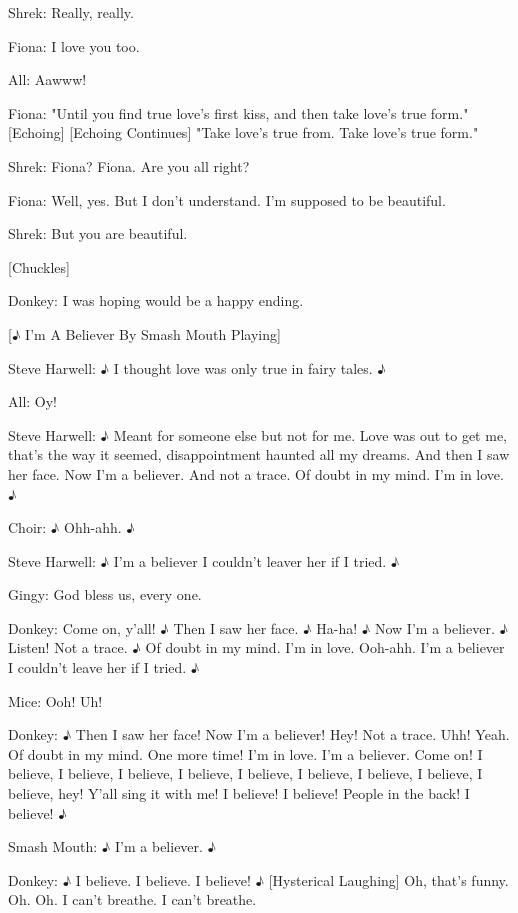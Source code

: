 \documentclass{article}
\begin{document}
Shrek:
Really, really.

Fiona:
I love you too.

All:
Aawww!

Fiona:
"Until you find true love's first kiss, and then take love's true form." [Echoing] [Echoing Continues] "Take love's true from. Take love's true form."

Shrek:
Fiona? Fiona. Are you all right?

Fiona:
Well, yes. But I don't understand. I'm supposed to be beautiful.

Shrek:
But you are beautiful.

[Chuckles]

Donkey:
I was hoping would be a happy ending.

[♪ I'm A Believer By Smash Mouth Playing]

Steve Harwell:
♪ I thought love was only true in fairy tales. ♪

All:
Oy!

Steve Harwell:
♪ Meant for someone else but not for me. Love was out to get me, that's the way it seemed, disappointment haunted all my dreams. And then I saw her face. Now I'm a believer. And not a trace. Of doubt in my mind. I'm in love. ♪

Choir:
♪ Ohh-ahh. ♪

Steve Harwell:
♪ I'm a believer I couldn't leaver her if I tried. ♪

Gingy:
God bless us, every one.

Donkey:
Come on, y'all! ♪ Then I saw her face. ♪ Ha-ha! ♪ Now I'm a believer. ♪ Listen! Not a trace. ♪ Of doubt in my mind. I'm in love. Ooh-ahh. I'm a believer I couldn't leave her if I tried. ♪

Mice:
Ooh! Uh!

Donkey:
♪ Then I saw her face! Now I'm a believer! Hey! Not a trace. Uhh! Yeah. Of doubt in my mind. One more time! I'm in love. I'm a believer. Come on! I believe, I believe, I believe, I believe, I believe, I believe, I believe, I believe, I believe, hey! Y'all sing it with me! I believe! I believe! People in the back! I believe! ♪

Smash Mouth:
♪ I'm a believer. ♪

Donkey:
♪ I believe. I believe. I believe! ♪ [Hysterical Laughing] Oh, that's funny. Oh. Oh. I can't breathe. I can't breathe.
\end{document}
